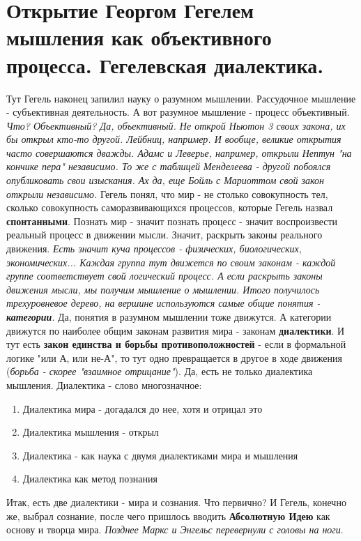 \section{Открытие Георгом Гегелем мышления как объективного процесса. Гегелевская диалектика.}
Тут Гегель наконец запилил науку о разумном мышлении. Рассудочное мышление - субъективная деятельность. А вот разумное мышление -  процесс объективный. \textit{Что? Объективный? Да, объективный. Не открой Ньютон 3 своих закона, их бы открыл кто-то другой. Лейбниц, например. И вообще, великие открытия часто совершаются дважды. Адамс и Леверье, например, открыли Нептун "на кончике пера" независимо. То же с таблицей Менделеева - другой побоялся опубликовать свои изыскания. Ах да, еще Бойль с Мариоттом свой закон открыли независимо.} Гегель понял, что мир - не столько совокупность тел, сколько совокупность саморазвивающихся процессов, которые Гегель назвал \textbf{спонтанными}. Познать мир - значит познать процесс - значит воспроизвести реальный процесс в движении мысли. Значит, раскрыть законы реального движения. \textit{Есть значит куча процессов - физических, биологических, экономических... Каждая группа тут движется по своим законам - каждой группе соответствует свой логический процесс. А если раскрыть законы движения мысли, мы получим мышление о мышлении. Итого получилось трехуровневое дерево, на вершине используются самые общие понятия - \textbf{категории}}. Да, понятия в разумном мышлении тоже движутся. А категории движутся по наиболее общим законам развития мира - законам \textbf{диалектики}. И тут есть \textbf{закон единства и борьбы противоположностей} - если в формальной логике "или А, или не-А", то тут одно превращается в другое в ходе движения (\textit{борьба - скорее "взаимное отрицание"}). Да, есть не только диалектика мышления. Диалектика - слово многозначное:
\begin{enumerate}
\item Диалектика мира - догадался до нее, хотя и отрицал это
\item Диалектика мышления - открыл
\item Диалектика - как наука с двумя диалектиками мира и мышления
\item Диалектика как метод познания
\end{enumerate}
Итак, есть две диалектики - мира и сознания. Что первично? И Гегель, конечно же, выбрал сознание, после чего пришлось вводить \textbf{Абсолютную Идею} как основу и творца мира. \textit{Позднее Маркс и Энгельс перевернули с головы на ноги}.

